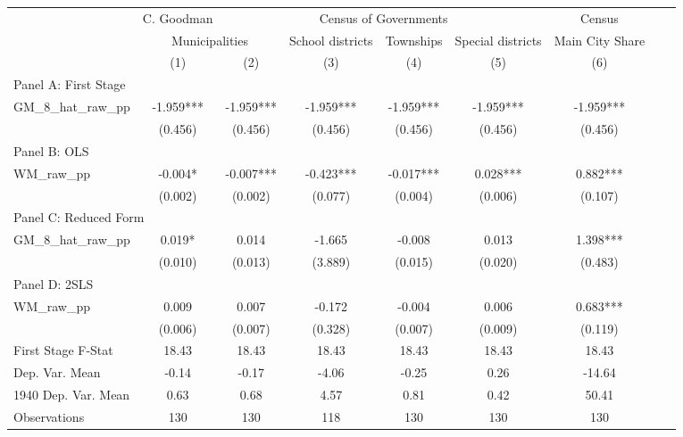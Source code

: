  \begin{tabular}{l*{8}{c}} \toprule
&\multicolumn{1}{c}{C. Goodman}&\multicolumn{4}{c}{Census of Governments}&\multicolumn{1}{c}{Census}\\\cmidrule(lr){2-2}\cmidrule(lr){3-6}\cmidrule(lr){7-7}
&\multicolumn{2}{c}{Municipalities}&\multicolumn{1}{c}{School districts}&\multicolumn{1}{c}{Townships}&\multicolumn{1}{c}{Special districts}&\multicolumn{1}{c}{Main City Share}\\\cmidrule(lr){2-3}\cmidrule(lr){4-6}\cmidrule(lr){7-7}
&\multicolumn{1}{c}{(1)}&\multicolumn{1}{c}{(2)}&\multicolumn{1}{c}{(3)}&\multicolumn{1}{c}{(4)}&\multicolumn{1}{c}{(5)}&\multicolumn{1}{c}{(6)}\\
\cmidrule(lr){1-7}
\multicolumn{6}{l}{Panel A: First Stage}\\
\cmidrule(lr){1-7}
GM\_8\_hat\_raw\_pp &   -1.959***&   -1.959***&   -1.959***&   -1.959***&   -1.959***&   -1.959***\\
                &  (0.456)   &  (0.456)   &  (0.456)   &  (0.456)   &  (0.456)   &  (0.456)   \\
\cmidrule(lr){1-7}
\multicolumn{6}{l}{Panel B: OLS}\\
\cmidrule(lr){1-7}
WM\_raw\_pp       &   -0.004*  &   -0.007***&   -0.423***&   -0.017***&    0.028***&    0.882***\\
                &  (0.002)   &  (0.002)   &  (0.077)   &  (0.004)   &  (0.006)   &  (0.107)   \\
\cmidrule(lr){1-7}
\multicolumn{6}{l}{Panel C: Reduced Form}\\
\cmidrule(lr){1-7}
GM\_8\_hat\_raw\_pp &    0.019*  &    0.014   &   -1.665   &   -0.008   &    0.013   &    1.398***\\
                &  (0.010)   &  (0.013)   &  (3.889)   &  (0.015)   &  (0.020)   &  (0.483)   \\
\cmidrule(lr){1-7}
\multicolumn{6}{l}{Panel D: 2SLS}\\
\cmidrule(lr){1-7}
WM\_raw\_pp       &    0.009   &    0.007   &   -0.172   &   -0.004   &    0.006   &    0.683***\\
                &  (0.006)   &  (0.007)   &  (0.328)   &  (0.007)   &  (0.009)   &  (0.119)   \\
\midrule
First Stage F-Stat&    18.43   &    18.43   &    18.43   &    18.43   &    18.43   &    18.43   \\
Dep. Var. Mean  &    -0.14   &    -0.17   &    -4.06   &    -0.25   &     0.26   &   -14.64   \\
1940 Dep. Var. Mean&     0.63   &     0.68   &     4.57   &     0.81   &     0.42   &    50.41   \\
Observations    &      130   &      130   &      118   &      130   &      130   &      130   \\
 \bottomrule \end{tabular}
